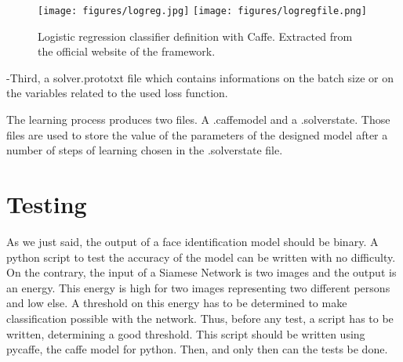 \begin{figure}[!ht]
  \centering
  \texttt{[image: figures/logreg.jpg]}
  \texttt{[image: figures/logregfile.png]}
  \caption[Logistic regression classifier definition with Caffe. Extracted from the official website of the framework.]{Logistic regression classifier definition with Caffe. Extracted from the official website of the framework.}
  \label{fig:logreg}
\end{figure}

\FloatBarrier

-Third, a solver.prototxt file which contains informations on the batch size or on the variables related to the used loss function.

The learning process produces two files. A .caffemodel and a .solverstate. Those files are used to store the value of the parameters of the designed model after a number of steps of learning chosen in the .solverstate file.

\section{Testing}

As we just said, the output of a face identification model should be binary. A python script to test the accuracy of the model can be written with no difficulty. On the contrary, the input of a Siamese Network is two images and the output is an energy. This energy is high for two images representing two different persons and low else. A threshold on this energy has to be determined to make classification possible with the network. Thus, before any test, a script has to be written, determining a good threshold. This script should be written using pycaffe, the caffe model for python. Then, and only then can the tests be done.